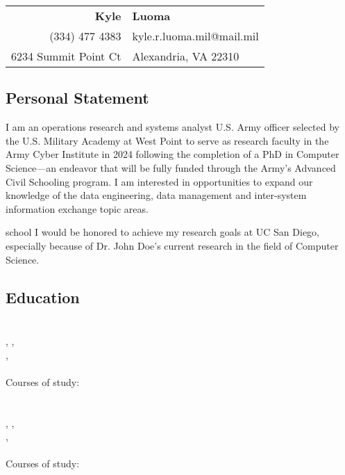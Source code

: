 \documentclass[12pt,letterpaper]{article}
\newcommand{\SchoolName}{UC San Diego}
\newcommand{\ProfessorName}{Dr. John Doe}
\newcommand{\FieldOfStudy}{Computer Science}
\begin{document}
\begin{center}
\begin{tabular}{rl}
\huge\textbf{Kyle} &\huge\textbf{Luoma}\\
(334) 477 4383 &kyle.r.luoma.mil@mail.mil\\
6234 Summit Point Ct &Alexandria, VA 22310\end{tabular}
\end{center}
\subsection{Personal Statement}
I am an operations research and systems analyst U.S. Army officer selected by the U.S. Military Academy at West Point to serve as research faculty in the Army Cyber Institute in 2024 following the completion of a PhD in Computer Science---an endeavor that will be fully funded through the Army's Advanced Civil Schooling program. I am interested in opportunities to expand our knowledge of the data engineering, data management and inter-system information exchange topic areas. 


\begin{shownto}{school}
I would be honored to achieve my research goals at \SchoolName, especially because of \ProfessorName 's current research in the field of \FieldOfStudy.
\end{shownto}

\subsection{Education}
\paragraph{\DegreeAType} 
\DegreeAName \\
\DegreeASchool , \DegreeACity , \DegreeAState \\
\DegreeAHonors , \DegreeADate \\
 \\
Courses of study: \DegreeACourses

\paragraph{\DegreeBType} 
\DegreeBName \\
\DegreeBSchool , \DegreeBCity , \DegreeBState \\
\DegreeBHonors , \DegreeBDate \\
 \\
Courses of study: \DegreeBCourses
\end{document}
